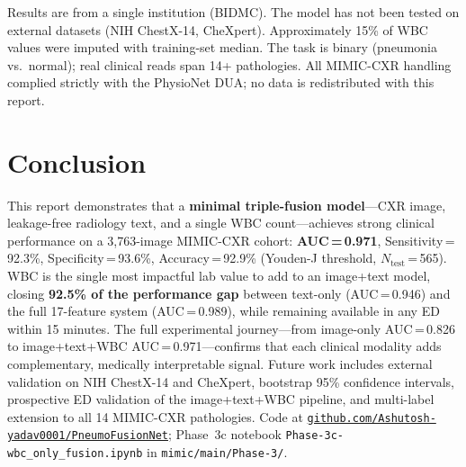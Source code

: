 \documentclass{article}
\begin{document}
Results are from a single institution (BIDMC). The model has not been tested
on external datasets (NIH ChestX-14, CheXpert). Approximately 15\% of WBC values
were imputed with training-set median. The task is binary (pneumonia vs.\ normal);
real clinical reads span 14+ pathologies. All MIMIC-CXR handling complied strictly
with the PhysioNet DUA; no data is redistributed with this report.

\section{Conclusion}

This report demonstrates that a \textbf{minimal triple-fusion model}---CXR image,
leakage-free radiology text, and a single WBC count---achieves strong clinical
performance on a 3,763-image MIMIC-CXR cohort:
\textbf{AUC\,=\,0.971}, Sensitivity\,=\,92.3\%, Specificity\,=\,93.6\%,
Accuracy\,=\,92.9\% (Youden-J threshold, $N_{\mathrm{test}}$\,=\,565).
WBC is the single most impactful lab value to add to an image+text model,
closing \textbf{92.5\% of the performance gap} between text-only
(AUC\,=\,0.946) and the full 17-feature system (AUC\,=\,0.989),
while remaining available in any ED within 15 minutes.
The full experimental journey---from image-only AUC\,=\,0.826 to
image+text+WBC AUC\,=\,0.971---confirms that each clinical modality adds
complementary, medically interpretable signal.
Future work includes external validation on NIH ChestX-14 and CheXpert,
bootstrap 95\% confidence intervals, prospective ED validation of the
image+text+WBC pipeline, and multi-label extension to all 14 MIMIC-CXR pathologies.
Code at \href{https://github.com/Ashutosh-yadav0001/PneumoFusionNet}%
{\texttt{github.com/Ashutosh-yadav0001/PneumoFusionNet}};
Phase~3c notebook \texttt{Phase-3c-wbc\_only\_fusion.ipynb} in
\texttt{mimic/main/Phase-3/}.
\end{document}
